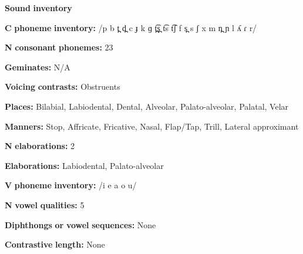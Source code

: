 \documentclass[output=paper]{langsci/langscibook}
\begin{document}
\begin{styleBody}
\textbf{Sound} \textbf{inventory}
\end{styleBody}

\begin{styleBody}
\textbf{C} \textbf{phoneme} \textbf{inventory:} /p b t̪ d̪ c ɟ k ɡ t̪͡s̪ t͡s t͡ʃ f s̪ s ʃ x m n̪ ɲ l ʎ ɾ r/
\end{styleBody}

\begin{styleBody}
\textbf{N} \textbf{consonant} \textbf{phonemes:} 23
\end{styleBody}

\begin{styleBody}
\textbf{Geminates:} N/A
\end{styleBody}

\begin{styleBody}
\textbf{Voicing} \textbf{contrasts:} Obstruents
\end{styleBody}

\begin{styleBody}
\textbf{Places:} Bilabial, Labiodental, Dental, Alveolar, Palato-alveolar, Palatal, Velar
\end{styleBody}

\begin{styleBody}
\textbf{Manners:} Stop, Affricate, Fricative, Nasal, Flap/Tap, Trill, Lateral approximant
\end{styleBody}

\begin{styleBody}
\textbf{N} \textbf{elaborations:} 2
\end{styleBody}

\begin{styleBody}
\textbf{Elaborations:} Labiodental, Palato-alveolar
\end{styleBody}

\begin{styleBody}
\textbf{V} \textbf{phoneme} \textbf{inventory:} /i e a o u/
\end{styleBody}

\begin{styleBody}
\textbf{N} \textbf{vowel} \textbf{qualities:} 5
\end{styleBody}

\begin{styleBody}
\textbf{Diphthongs} \textbf{or} \textbf{vowel} \textbf{sequences:} None
\end{styleBody}

\begin{styleBody}
\textbf{Contrastive} \textbf{length:} None
\end{styleBody}
\end{document}
